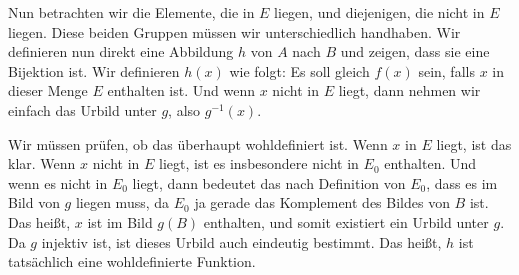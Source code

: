 \begin{spoken-clean}[00:27:30 - 00:29:10]
Nun betrachten wir die Elemente, die in $E$ liegen, und diejenigen, die nicht in $E$ liegen. Diese beiden Gruppen müssen wir unterschiedlich handhaben. Wir definieren nun direkt eine Abbildung $h$ von $A$ nach $B$ und zeigen, dass sie eine Bijektion ist. Wir definieren $h(x)$ wie folgt: Es soll gleich $f(x)$ sein, falls $x$ in dieser Menge $E$ enthalten ist. Und wenn $x$ nicht in $E$ liegt, dann nehmen wir einfach das Urbild unter $g$, also $g^{-1}(x)$.

Wir müssen prüfen, ob das überhaupt wohldefiniert ist. Wenn $x$ in $E$ liegt, ist das klar. Wenn $x$ nicht in $E$ liegt, ist es insbesondere nicht in $E_0$ enthalten. Und wenn es nicht in $E_0$ liegt, dann bedeutet das nach Definition von $E_0$, dass es im Bild von $g$ liegen muss, da $E_0$ ja gerade das Komplement des Bildes von $B$ ist. Das heißt, $x$ ist im Bild $g(B)$ enthalten, und somit existiert ein Urbild unter $g$. Da $g$ injektiv ist, ist dieses Urbild auch eindeutig bestimmt. Das heißt, $h$ ist tatsächlich eine wohldefinierte Funktion.
\end{spoken-clean}

